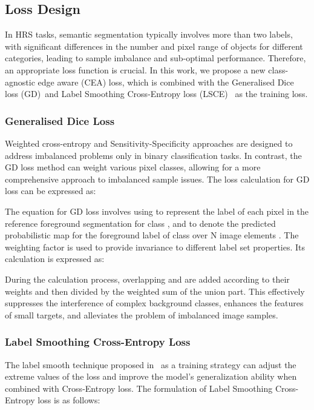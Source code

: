 \documentclass[journal]{IEEEtran}
\begin{document}
\subsection{Loss Design}
In HRS tasks, semantic segmentation typically involves more than two labels, with significant differences in the number and pixel range of objects for different categories, leading to sample imbalance and sub-optimal performance. Therefore, an appropriate loss function is crucial. In this work, we propose a new class-agnostic edge aware (CEA) loss, which is combined with the Generalised Dice loss (GD)~\cite{sudre2017generalised}and Label Smoothing Cross-Entropy loss (LSCE)~\cite{muller2019does} as the training loss.

\subsubsection{Generalised Dice Loss}
Weighted cross-entropy and Sensitivity-Specificity approaches are designed to address imbalanced problems only in binary classification tasks. In contrast, the GD loss method can weight various pixel classes, allowing for a more comprehensive approach to imbalanced sample issues. The loss calculation for GD loss can be expressed as:



The equation for GD loss involves using  to represent the label of each pixel in the reference foreground segmentation for class , and  to denote the predicted probabilistic map for the foreground label of class  over N image elements . The weighting factor  is used to provide invariance to different label set properties. Its calculation is expressed as:


During the calculation process, overlapping  and  are added according to their weights and then divided by the weighted sum of the union part. This effectively suppresses the interference of complex background classes, enhances the features of small targets, and alleviates the problem of imbalanced image samples.

\subsubsection{Label Smoothing Cross-Entropy Loss}
The label smooth technique proposed in~\cite{muller2019does} as a training strategy can adjust the extreme values of the loss and improve the model's generalization ability when combined with Cross-Entropy loss. The formulation of Label Smoothing Cross-Entropy loss is as follows:
\end{document}
